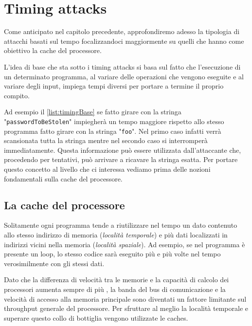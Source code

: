 \chapter{Timing attacks}
	Come anticipato nel capitolo precedente, approfondiremo adesso la tipologia di attacchi basati sul tempo focalizzandoci maggiormente su quelli che hanno come obiettivo la cache del processore. 
	
	L'idea di base che sta sotto i timing attacks si basa sul fatto che l'esecuzione di un determinato programma, al variare delle operazioni che vengono eseguite e al variare degli input, impiega tempi diversi per portare a termine il proprio compito.
	
	
		
	Ad esempio il \cref{list:timingBase} se fatto girare con la stringa "\texttt{passwordToBeStolen}" impiegherà un tempo maggiore rispetto allo stesso programma fatto girare con la stringa "\texttt{foo}". Nel primo caso infatti verrà scansionata tutta la stringa mentre nel secondo caso si interromperà immediatamente. Questa informazione può essere utilizzata dall'attaccante che, procedendo per tentativi, può arrivare a ricavare la stringa esatta. Per portare questo concetto al livello che ci interessa vediamo prima delle nozioni fondamentali sulla cache del processore. 
	
	\section{La cache del processore}
		Solitamente ogni programma tende a riutilizzare nel tempo un dato contenuto allo stesso indirizzo di memoria (\emph{località temporale}) e più dati localizzati in indirizzi vicini nella memoria (\emph{località spaziale}). Ad esempio, se nel programma è presente un loop, lo stesso codice sarà eseguito più e più volte nel tempo verosimilmente con gli stessi dati.
		
		Dato che la differenza di velocità tra le memorie e la capacità di calcolo dei processori aumenta sempre di più \cite{hennessy2011computer}, la banda del bus di comunicazione e la velocità di accesso alla memoria principale sono diventati un fattore limitante sul throughput generale del processore. Per sfruttare al meglio la località temporale e superare questo collo di bottiglia vengono utilizzate le caches. 
		
